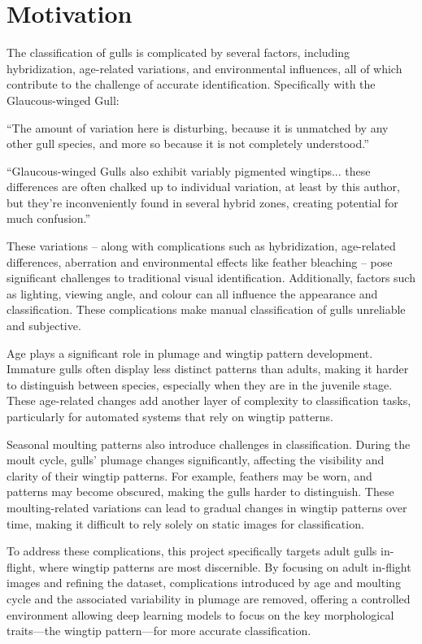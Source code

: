 
\chapter{Motivation}

The classification of gulls is complicated by several factors, including hybridization, age-related variations, and environmental influences, all of which contribute to the challenge of accurate identification. Specifically with the Glaucous-winged Gull:

``The amount of variation here is disturbing, because it is unmatched by any other gull species, and more so because it is not completely understood.'' \cite{gull_variation}

``Glaucous-winged Gulls also exhibit variably pigmented wingtips... these differences are often chalked up to individual variation, at least by this author, but they're inconveniently found in several hybrid zones, creating potential for much confusion.'' \cite{gull_variation}

These variations – along with complications such as hybridization, age-related differences, aberration and environmental effects like feather bleaching – pose significant challenges to traditional visual identification. Additionally, factors such as lighting, viewing angle, and colour can all influence the appearance and classification. These complications make manual classification of gulls unreliable and subjective. \cite{gull_variation}

Age plays a significant role in plumage and wingtip pattern development. Immature gulls often display less distinct patterns than adults, making it harder to distinguish between species, especially when they are in the juvenile stage. These age-related changes add another layer of complexity to classification tasks, particularly for automated systems that rely on wingtip patterns. \cite{gull_variation}

Seasonal moulting patterns also introduce challenges in classification. During the moult cycle, gulls' plumage changes significantly, affecting the visibility and clarity of their wingtip patterns. For example, feathers may be worn, and patterns may become obscured, making the gulls harder to distinguish. These moulting-related variations can lead to gradual changes in wingtip patterns over time, making it difficult to rely solely on static images for classification.

To address these complications, this project specifically targets adult gulls in-flight, where wingtip patterns are most discernible. By focusing on adult in-flight images and refining the dataset, complications introduced by age and moulting cycle and the associated variability in plumage are removed, offering a controlled environment allowing deep learning models to focus on the key morphological traits—the wingtip pattern—for more accurate classification.

